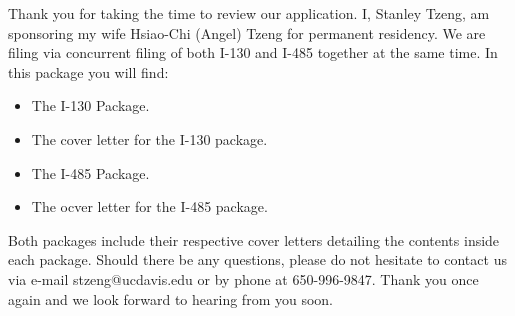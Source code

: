\documentclass[stdletter]{newlfm}
\begin{document}
 
\begin{newlfm}
Thank you for taking the time to review our application.  I, Stanley Tzeng, am sponsoring my wife Hsiao-Chi (Angel) Tzeng for permanent residency.  We are filing via concurrent filing of both I-130 and I-485 together at the same time.  In this package you will find:
\begin{itemize}
\item The I-130 Package.
\item The cover letter for the I-130 package. 
\item The I-485 Package.
\item The ocver letter for the I-485 package.




\end{itemize}

Both packages include their respective cover letters detailing the contents inside each package.  Should there be any questions, please do not hesitate to contact us via e-mail stzeng@ucdavis.edu or by phone at 650-996-9847.  Thank you once again and we look forward to hearing from you soon.
\end{newlfm}
\end{document}
